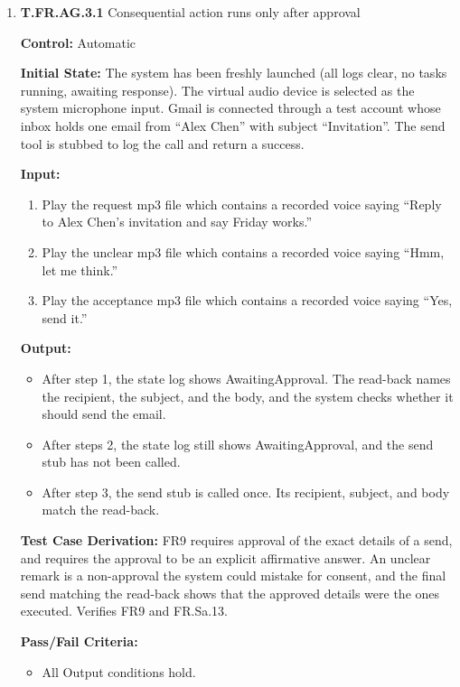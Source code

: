 \documentclass[12pt, titlepage]{article}
\begin{document}
\begin{enumerate}

\item{\textbf{T.FR.AG.3.1} Consequential action runs only after approval\\}\label{test:T.FR.AG.3.1}

\textbf{Control:} Automatic

\textbf{Initial State:} The system has been freshly launched (all logs clear, no tasks running, awaiting response).
The virtual audio device is selected as the system microphone input. Gmail is connected through a test account whose inbox holds one email from ``Alex Chen''
with subject ``Invitation''. The send tool is stubbed to log the call and return a success.

\textbf{Input:}
\begin{enumerate}
  \item Play the request mp3 file which contains a recorded voice saying ``Reply to Alex Chen's invitation and say Friday works.''
  \item Play the unclear mp3 file which contains a recorded voice saying ``Hmm, let me think.''
  \item Play the acceptance mp3 file which contains a recorded voice saying ``Yes, send it.''
\end{enumerate}

\textbf{Output:}
\begin{itemize}
  \item After step 1, the state log shows AwaitingApproval. The read-back names the recipient, the subject, and the body, and the system checks whether it should send the email.
  \item After steps 2, the state log still shows AwaitingApproval, and the send stub has not been called.
  \item After step 3, the send stub is called once. Its recipient, subject, and body match the read-back.
\end{itemize}

\textbf{Test Case Derivation:} FR9 requires approval of the exact details of a send, and requires the approval to be an explicit affirmative answer. 
An unclear remark is a non-approval the system could mistake for consent, and the final send matching the read-back shows 
that the approved details were the ones executed. Verifies FR9 and FR.Sa.13.

\textbf{Pass/Fail Criteria:}
\begin{itemize}
  \item All Output conditions hold.
\end{itemize}


\end{enumerate}
\end{document}
